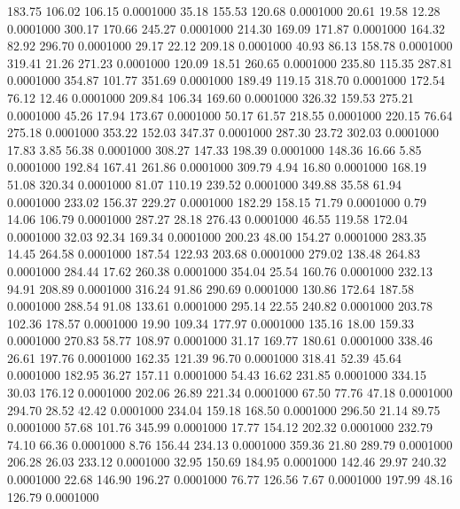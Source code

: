  183.75  106.02  106.15   0.0001000
  35.18  155.53  120.68   0.0001000
  20.61   19.58   12.28   0.0001000
 300.17  170.66  245.27   0.0001000
 214.30  169.09  171.87   0.0001000
 164.32   82.92  296.70   0.0001000
  29.17   22.12  209.18   0.0001000
  40.93   86.13  158.78   0.0001000
 319.41   21.26  271.23   0.0001000
 120.09   18.51  260.65   0.0001000
 235.80  115.35  287.81   0.0001000
 354.87  101.77  351.69   0.0001000
 189.49  119.15  318.70   0.0001000
 172.54   76.12   12.46   0.0001000
 209.84  106.34  169.60   0.0001000
 326.32  159.53  275.21   0.0001000
  45.26   17.94  173.67   0.0001000
  50.17   61.57  218.55   0.0001000
 220.15   76.64  275.18   0.0001000
 353.22  152.03  347.37   0.0001000
 287.30   23.72  302.03   0.0001000
  17.83    3.85   56.38   0.0001000
 308.27  147.33  198.39   0.0001000
 148.36   16.66    5.85   0.0001000
 192.84  167.41  261.86   0.0001000
 309.79    4.94   16.80   0.0001000
 168.19   51.08  320.34   0.0001000
  81.07  110.19  239.52   0.0001000
 349.88   35.58   61.94   0.0001000
 233.02  156.37  229.27   0.0001000
 182.29  158.15   71.79   0.0001000
   0.79   14.06  106.79   0.0001000
 287.27   28.18  276.43   0.0001000
  46.55  119.58  172.04   0.0001000
  32.03   92.34  169.34   0.0001000
 200.23   48.00  154.27   0.0001000
 283.35   14.45  264.58   0.0001000
 187.54  122.93  203.68   0.0001000
 279.02  138.48  264.83   0.0001000
 284.44   17.62  260.38   0.0001000
 354.04   25.54  160.76   0.0001000
 232.13   94.91  208.89   0.0001000
 316.24   91.86  290.69   0.0001000
 130.86  172.64  187.58   0.0001000
 288.54   91.08  133.61   0.0001000
 295.14   22.55  240.82   0.0001000
 203.78  102.36  178.57   0.0001000
  19.90  109.34  177.97   0.0001000
 135.16   18.00  159.33   0.0001000
 270.83   58.77  108.97   0.0001000
  31.17  169.77  180.61   0.0001000
 338.46   26.61  197.76   0.0001000
 162.35  121.39   96.70   0.0001000
 318.41   52.39   45.64   0.0001000
 182.95   36.27  157.11   0.0001000
  54.43   16.62  231.85   0.0001000
 334.15   30.03  176.12   0.0001000
 202.06   26.89  221.34   0.0001000
  67.50   77.76   47.18   0.0001000
 294.70   28.52   42.42   0.0001000
 234.04  159.18  168.50   0.0001000
 296.50   21.14   89.75   0.0001000
  57.68  101.76  345.99   0.0001000
  17.77  154.12  202.32   0.0001000
 232.79   74.10   66.36   0.0001000
   8.76  156.44  234.13   0.0001000
 359.36   21.80  289.79   0.0001000
 206.28   26.03  233.12   0.0001000
  32.95  150.69  184.95   0.0001000
 142.46   29.97  240.32   0.0001000
  22.68  146.90  196.27   0.0001000
  76.77  126.56    7.67   0.0001000
 197.99   48.16  126.79   0.0001000
